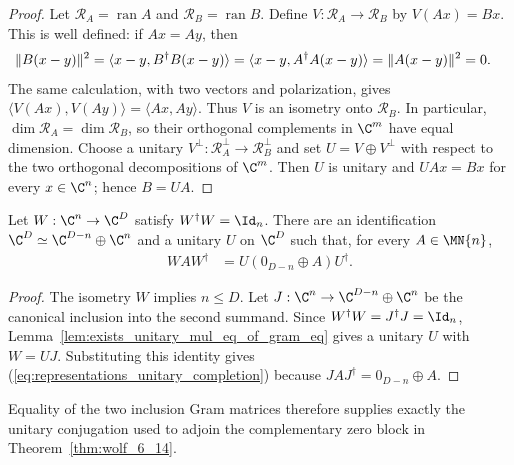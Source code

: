 \begin{proof}
    \leanok
    Let $\mathcal R_A=\operatorname{ran}A$ and
    $\mathcal R_B=\operatorname{ran}B$. Define
    $V:\mathcal R_A\to\mathcal R_B$ by $V(Ax)=Bx$. This is well defined:
    if $Ax=Ay$, then
    \begin{align}
        \lVert B(x-y)\rVert^2
         & =\langle x-y,B^\dagger B(x-y)\rangle
        =\langle x-y,A^\dagger A(x-y)\rangle
        =\lVert A(x-y)\rVert^2=0.
        \notag
    \end{align}
    The same calculation, with two vectors and polarization, gives
    $\langle V(Ax),V(Ay)\rangle=\langle Ax,Ay\rangle$. Thus $V$ is an
    isometry onto $\mathcal R_B$. In particular,
    $\dim\mathcal R_A=\dim\mathcal R_B$, so their orthogonal complements
    in $\C^m$ have equal dimension. Choose a unitary
    $V^\perp:\mathcal R_A^\perp\to\mathcal R_B^\perp$ and set
    $U=V\oplus V^\perp$ with respect to the two orthogonal decompositions of
    $\C^m$. Then $U$ is unitary and $UAx=Bx$ for every $x\in\C^n$; hence
    $B=UA$.
\end{proof}

\begin{theorem}
    \label{thm:isometric_inclusion_zero_extension}
    \leanok
    Let $W:\C^n\to\C^D$ satisfy $W^\dagger W=\Id_n$. There are an
    identification $\C^D\simeq\C^{D-n}\oplus\C^n$ and a unitary $U$ on
    $\C^D$ such that, for every $A\in\MN{n}$,
    \begin{align}
        WAW^\dagger
         & =U(0_{D-n}\oplus A)U^\dagger.
        \label{eq:representations_unitary_completion}
    \end{align}
\end{theorem}

\begin{proof}
    \leanok
    The isometry $W$ implies $n\leq D$. Let $J:\C^n\to
        \C^{D-n}\oplus\C^n$ be the canonical inclusion into the second summand.
    Since $W^\dagger W=J^\dagger J=\Id_n$,
    Lemma~\ref{lem:exists_unitary_mul_eq_of_gram_eq}
    gives a unitary $U$ with $W=UJ$. Substituting this identity gives
    (\ref{eq:representations_unitary_completion}) because
    $JAJ^\dagger=0_{D-n}\oplus A$.
\end{proof}

Equality of the two inclusion Gram matrices therefore supplies exactly the
unitary conjugation used to adjoin the complementary zero block in
Theorem~\ref{thm:wolf_6_14}.


